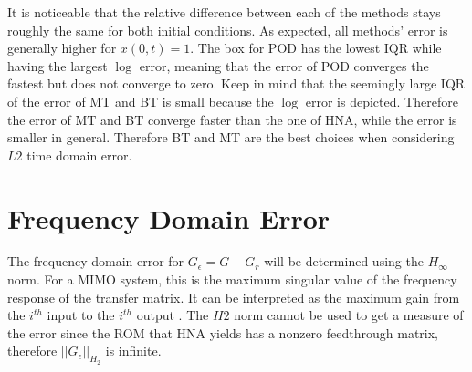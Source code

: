 It is noticeable that the relative difference between each of the methods stays roughly the same for both initial conditions.
As expected, all methods' error is generally higher for \(x(0, t) = 1\).
The box for POD has the lowest IQR while having the largest \(\log\) error, meaning that the error of POD converges the fastest but does not converge to zero.
Keep in mind that the seemingly large IQR of the error of MT and BT is small because the \(\log\) error is depicted.
Therefore the error of MT and BT converge faster than the one of HNA, while the error is smaller in general.
Therefore BT and MT are the best choices when considering \(L2\) time domain error.



\section{Frequency Domain Error}
The frequency domain error for \(G_{\epsilon }= G - G_r\) will be determined using the \(H_{\infty}\) norm.
For a MIMO system, this is the maximum singular value of the frequency response of the transfer matrix.
It can be interpreted as the maximum gain from the \(i^{th}\) input to the \(i^{th}\) output \cite{eugenio}.
The \(H2\) norm cannot be used to get a measure of the error since the ROM that HNA yields has a nonzero feedthrough matrix, therefore \(||G_{\epsilon}||_{H_{2}}\) is infinite. 

